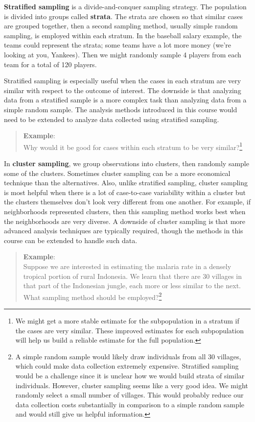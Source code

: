 \documentclass[
]{book}
\begin{document}
\textbf{Stratified sampling} is a divide-and-conquer sampling strategy. The population is divided into groups called \textbf{strata}. The strata are chosen so that similar cases are grouped together, then a second sampling method, usually simple random sampling, is employed within each stratum. In the baseball salary example, the teams could represent the strata; some teams have a lot more money (we're looking at you, Yankees). Then we might randomly sample 4 players from each team for a total of 120 players.

Stratified sampling is especially useful when the cases in each stratum are very similar with respect to the outcome of interest. The downside is that analyzing data from a stratified sample is a more complex task than analyzing data from a simple random sample. The analysis methods introduced in this course would need to be extended to analyze data collected using stratified sampling.

\begin{quote}
\textbf{Example}:\\
Why would it be good for cases within each stratum to be very similar?\footnote{We might get a more stable estimate for the subpopulation in a stratum if the cases are very similar. These improved estimates for each subpopulation will help us build a reliable estimate for the full population.}
\end{quote}

In \textbf{cluster sampling}, we group observations into clusters, then randomly sample some of the clusters. Sometimes cluster sampling can be a more economical technique than the alternatives. Also, unlike stratified sampling, cluster sampling is most helpful when there is a lot of case-to-case variability within a cluster but the clusters themselves don't look very different from one another. For example, if neighborhoods represented clusters, then this sampling method works best when the neighborhoods are very diverse. A downside of cluster sampling is that more advanced analysis techniques are typically required, though the methods in this course can be extended to handle such data.

\begin{quote}
\textbf{Example}:\\
Suppose we are interested in estimating the malaria rate in a densely tropical portion of rural Indonesia. We learn that there are 30 villages in that part of the Indonesian jungle, each more or less similar to the next. What sampling method should be employed?\footnote{A simple random sample would likely draw individuals from all 30 villages, which could make data collection extremely expensive. Stratified sampling would be a challenge since it is unclear how we would build strata of similar individuals. However, cluster sampling seems like a very good idea. We might randomly select a small number of villages. This would probably reduce our data collection costs substantially in comparison to a simple random sample and would still give us helpful information.}
\end{quote}
\end{document}
